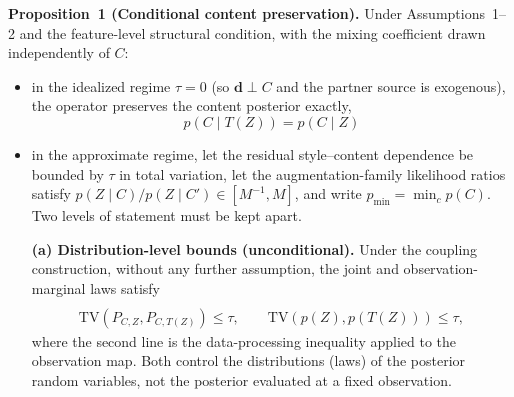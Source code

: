 \documentclass[electronics,article,submit,moreauthors]{Definitions/mdpi}
\newcommand{\add}[1]{\textcolor{addblue}{#1}}
\newcommand{\del}[1]{\textcolor{delred}{\st{#1}}}
\newcommand{\delmath}[1]{\textcolor{delred}{\cancel{#1}}}
\def\add#1{#1}
\def\del#1{}
\def\delmath#1{}
\begin{document}
\noindent\textbf{Proposition~1 (Conditional content preservation).} Under Assumptions~1--2 and the feature-level structural condition, with the mixing coefficient drawn independently of $C$:
\begin{itemize}[leftmargin=2.7em,labelwidth=2.3em,labelsep=0.4em,align=left]
\item[(L2-i)] in the idealized regime $\tau=0$ (so $\mathbf{d}\perp C$ and the partner source is exogenous), the operator preserves the content posterior exactly,
\begin{equation}
p(C\mid T(Z))=p(C\mid Z)
\end{equation}
\item[(L2-ii)] in the approximate regime, let the residual style--content dependence be bounded by $\tau$ in total variation, let the augmentation-family likelihood ratios satisfy $p(Z\mid C)/p(Z\mid C')\in[M^{-1},M]$, and write $p_{\min}=\min_c p(C)$. \del{The primary bound is in total variation,}\add{Two levels of statement must be kept apart.}

\add{\textbf{(a) Distribution-level bounds (unconditional).} Under the coupling construction, without any further assumption, the joint and observation-marginal laws satisfy}
\begin{equation}
\begin{gathered}
\delmath{\mathrm{TV}\!\left(p(C\mid Z),\,p(C\mid T(Z))\right)\le \tau,}\\
\add{\mathrm{TV}\!\left(P_{C,Z},P_{C,T(Z)}\right)\le\tau,\qquad
\mathrm{TV}\!\left(p(Z),p(T(Z))\right)\le\tau,}
\end{gathered}
\label{eq:tvbound}
\end{equation}
\add{where the second line is the data-processing inequality applied to the observation map. Both control the distributions (laws) of the posterior random variables, not the posterior evaluated at a fixed observation.}


\end{itemize}
\end{document}
